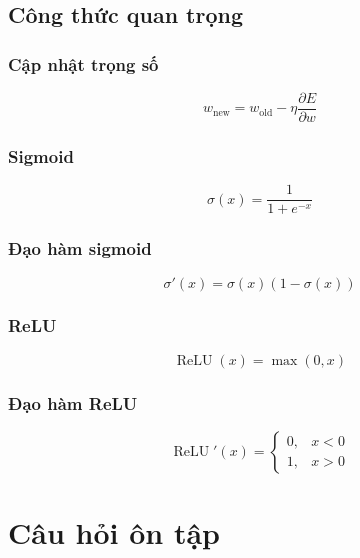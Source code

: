 \documentclass[12pt,a4paper]{report}
\begin{document}
\section{Công thức quan trọng}

\subsection*{Cập nhật trọng số}

\[
    w_{\text{new}}
    =
    w_{\text{old}}
    -
    \eta
    \frac{\partial E}{\partial w}
\]

\subsection*{Sigmoid}

\[
    \sigma(x)=\frac{1}{1+e^{-x}}
\]

\subsection*{Đạo hàm sigmoid}

\[
    \sigma'(x)=\sigma(x)(1-\sigma(x))
\]

\subsection*{ReLU}

\[
    \operatorname{ReLU}(x)=\max(0,x)
\]

\subsection*{Đạo hàm ReLU}

\[
    \operatorname{ReLU}'(x)=
    \begin{cases}
    0, & x<0\\
    1, & x>0
    \end{cases}
\]

\chapter{Câu hỏi ôn tập}
\end{document}
